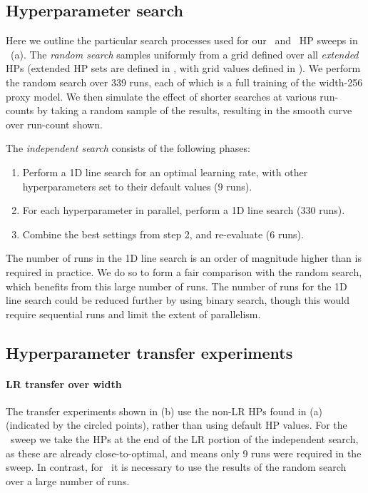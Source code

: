 \subsection{Hyperparameter search} \label{app:umup_hp_search_algorithm}

Here we outline the particular search processes used for our \mup\ and \umup\ HP sweeps in ~(a). The \textit{random search} samples uniformly from a grid defined over all \textit{extended} HPs (extended HP sets are defined in , with grid values defined in ). We perform the random search over 339 runs, each of which is a full training of the width-256 proxy model. We then simulate the effect of shorter searches at various run-counts by taking a random sample of the results, resulting in the smooth curve over run-count shown.

The \textit{independent search} consists of the following phases:

\begin{enumerate}
    \item Perform a 1D line search for an optimal learning rate, with other hyperparameters set to their default values ($9$ runs).
    \item For each hyperparameter in parallel, perform a 1D line search ($330$ runs).
    \item Combine the best settings from step 2, and re-evaluate ($6$ runs).
\end{enumerate}

The number of runs in the 1D line search is an order of magnitude higher than is required in practice. We do so to form a fair comparison with the random search, which benefits from this large number of runs. The number of runs for the 1D line search could be reduced further by using binary search, though this would require sequential runs and limit the extent of parallelism.

\FloatBarrier

\subsection{Hyperparameter transfer experiments} \label{app:transfer_experiments}

\paragraph{LR transfer over width} The transfer experiments shown in  (b) use the non-LR HPs found in  (a) (indicated by the circled points), rather than using default HP values. For the \umup\ sweep we take the HPs at the end of the LR portion of the independent search, as these are already close-to-optimal, and means only 9 runs were required in the sweep. In contrast, for \mup\ it is necessary to use the results of the random search over a large number of runs.

